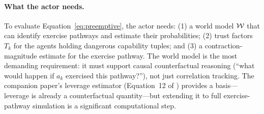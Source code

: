 \paragraph{What the actor needs.} To evaluate
Equation~\eqref{eq:preemptive}, the actor needs: (1) a world model
$\mathcal{W}$ that can identify exercise pathways and estimate their
probabilities; (2) trust factors $T_k$ for the agents holding dangerous
capability tuples; and (3) a contraction-magnitude estimate for the
exercise pathway. The world model is the most demanding requirement: it must
support causal counterfactual reasoning \citep{pearl2009causality} (``what
would happen if $a_k$ exercised this pathway?''), not just correlation
tracking. The companion
paper's leverage estimator (Equation~12 of \citet{lasser2026poset}) provides
a basis---leverage is already a counterfactual quantity---but extending it to
full exercise-pathway simulation is a significant computational step.
